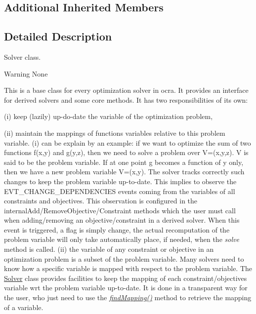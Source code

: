 \subsection*{Additional Inherited Members}


\subsection{Detailed Description}
Solver class. 

\begin{DoxyWarning}{Warning}
None
\end{DoxyWarning}
This is a base class for every optimization solver in ocra. It provides an interface for derived solvers and some core methods. It has two responsibilities of its own\+:
\begin{DoxyItemize}
\item (i) keep (lazily) up-\/do-\/date the variable of the optimization problem,
\item (ii) maintain the mappings of function\textquotesingle{}s variables relative to this problem variable. (i) can be explain by an example\+: if we want to optimize the sum of two functions f(x,y) and g(y,z), then we need to solve a problem over V=(x,y,z). V is said to be the problem variable. If at one point g becomes a function of y only, then we have a new problem variable V\textquotesingle{}=(x,y). The solver tracks correctly such changes to keep the problem variable up-\/to-\/date. This implies to observe the E\+V\+T\+\_\+\+C\+H\+A\+N\+G\+E\+\_\+\+D\+E\+P\+E\+N\+D\+E\+N\+C\+I\+ES events coming from the variables of all constraints and objectives. This observation is configured in the internal\+Add/\+Remove\+Objective/\+Constraint methods which the user must call when adding/removing an objective/constraint in a derived solver. When this event is triggered, a flag is simply change, the actual recomputation of the problem variable will only take automatically place, if needed, when the {\itshape solve} method is called. (ii) the variable of any constraint or objective in an optimization problem is a subset of the problem variable. Many solvers need to know how a specific variable is mapped with respect to the problem variable. The \hyperlink{classocra_1_1Solver}{Solver} class provides facilities to keep the mapping of each constraint/objective\textquotesingle{}s variable wrt the problem variable up-\/to-\/date. It is done in a transparent way for the user, who just need to use the {\itshape \hyperlink{classocra_1_1Solver_a67ee15c2dd55a5345f3872b35fca59cd}{find\+Mapping()}} method to retrieve the mapping of a variable.
\end{DoxyItemize}

